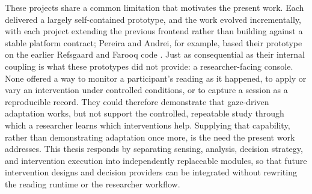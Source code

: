 These projects share a common limitation that motivates the present work.
Each delivered a largely self-contained prototype, and the work evolved incrementally, with each project extending the previous frontend rather than building against a stable platform contract; Pereira and Andrei, for example, based their prototype on the earlier Refsgaard and Farooq code \cite{refsgaard2024rtr, pereira2024typography}.
Just as consequential as their internal coupling is what these prototypes did not provide: a researcher-facing console.
None offered a way to monitor a participant's reading as it happened, to apply or vary an intervention under controlled conditions, or to capture a session as a reproducible record.
They could therefore demonstrate that gaze-driven adaptation works, but not support the controlled, repeatable study through which a researcher learns which interventions help.
Supplying that capability, rather than demonstrating adaptation once more, is the need the present work addresses.
This thesis responds by separating sensing, analysis, decision strategy, and intervention execution into independently replaceable modules, so that future intervention designs and decision providers can be integrated without rewriting the reading runtime or the researcher workflow.

